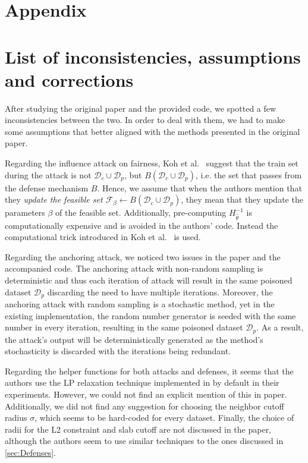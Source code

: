 \newpage
\section*{Appendix}
\appendix
\section{List of inconsistencies, assumptions and corrections}
\label{app:inconsistencies}
After studying the original paper and the provided code, we spotted a few inconsistencies between the two. In order to deal with them, we had to make some assumptions that better aligned with the methods presented in the original paper.

Regarding the influence attack on fairness, Koh et al.~\cite{koh2018} suggest that the train set during the attack is not $\mathcal{D}_c \cup \mathcal{D}_p$, but $B(\mathcal{D}_c \cup \mathcal{D}_p)$, i.e. the set that passes from the defense mechanism $B$. Hence, we assume that when the authors mention that they \textit{update the feasible set $\mathcal{F}_{\beta} \leftarrow B(\mathcal{D}_c \cup \mathcal{D}_p)$}, they mean that they update the parameters $\beta$ of the feasible set. Additionally, pre-computing $H^{-1}_{\hat{\theta}}$ is computationally expensive and is avoided in the authors' code. Instead the computational trick introduced in Koh et al.~\cite{koh2017} is used.

Regarding the anchoring attack, we noticed two issues in the paper and the accompanied code. The anchoring attack with non-random sampling is deterministic and thus each iteration of attack will result in the same poisoned dataset $\mathcal{D}_p$ discarding the need to have multiple iterations. Moreover, the anchoring attack with random sampling is a stochastic method, yet in the existing implementation, the random number generator is seeded with the same number in every iteration, resulting in the same poisoned dataset $\mathcal{D}_p$. As a result, the attack's output will be deterministically generated as the method's stochasticity is discarded with the iterations being redundant.

Regarding the helper functions for both attacks and defenses, it seems that the authors use the LP relaxation technique implemented in \cite{koh2018} by default in their experiments. However, we could not find an explicit mention of this in paper. Additionally, we did not find any suggestion for choosing the neighbor cutoff radius $\sigma$, which seems to be hard-coded for every dataset. Finally, the choice of radii for the L2 constraint and slab cutoff are not discussed in the paper, although the authors seem to use similar techniques to the ones discussed in \ref{sec:Defenses}.

